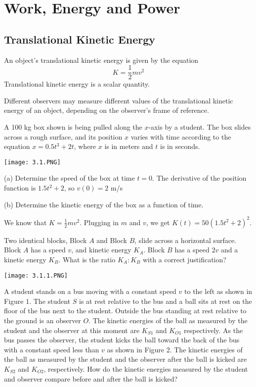 \documentclass[../mech.tex]{subfiles}
\begin{document}
\chapter{Work, Energy and Power}
\section{Translational Kinetic Energy}
An object's translational kinetic energy is given by the equation 
\[ K=\frac{1}{2}mv^2 \]
Translational kinetic energy is a scalar quantity.

Different observers may measure different values of the translational kinetic energy of an object, depending on the observer's frame of reference.
\begin{example}
    A 100 kg box shown is being pulled along the $x$-axis by a student. The box slides across a rough surface, and its position $x$ varies with time according to the equation 
    $x=0.5t^3+2t$, where $x$ is in meters and $t$ is in seconds.
    \begin{center}
        \texttt{[image: 3.1.PNG]}
    \end{center}
    (a) Determine the speed of the box at time $t=0$.
    The derivative of the position function is $1.5t^2+2$, so $v(0)=2$ m/s 

    (b) Determine the kinetic energy of the box as a function of time.

    We know that $K=\frac{1}{2}mv^2$. Plugging in $m$ and $v$, we get $K(t)=50(1.5t^2+2)^2$.
\end{example}

\ex Two identical blocks, Block $A$ and Block $B$, slide across a horizontal surface. Block $A$ has a speed $v$, and kinetic energy $K_A$. Block $B$ has a speed 
$2v$ and a kinetic energy $K_B$. What is the ratio $K_A:K_B$ with a correct justification?

\ex \begin{center}
    \texttt{[image: 3.1.1.PNG]}
\end{center}
A student stands on a bus moving with a constant speed $v$ to the left as shown in Figure 1. The student $S$ is at rest relative to the bus and a ball sits at rest on the floor of the bus next to the student.
Outside the bus standing at rest relative to the ground is an observer $O$. The kinetic energies of the ball as measured by the student and the observer at this moment are $K_{S1}$ and $K_{O1}$ respectively.
As the bus passes the observer, the student kicks the ball toward the back of the bus with a constant speed less than $v$ as shown in Figure 2. The kinetic energies of the ball as measured by the student and the observer 
after the ball is kicked are $K_{S2}$ and $K_{O2}$, respectively. How do the kinetic energies measured by the student and observer compare before and after the ball is kicked?
\end{document}

